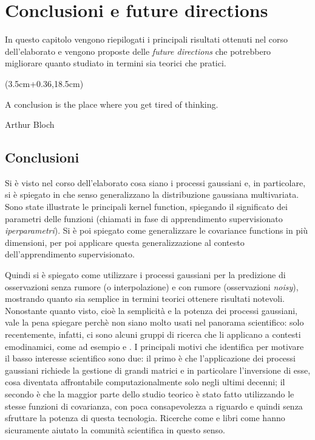 \chapter{Conclusioni e future directions}
In questo capitolo vengono riepilogati i principali risultati ottenuti nel corso dell'elaborato e vengono proposte delle \textit{future directions} che potrebbero migliorare quanto studiato in termini sia teorici che pratici.

\begin{textblock*}{0.64\textwidth}(3.5cm+0.36\textwidth,18.5cm)
\epigraph{A conclusion is the place where you get tired of thinking.}{Arthur Bloch}
\end{textblock*}

\newpage



\section{Conclusioni}
Si è visto nel corso dell'elaborato cosa siano i processi gaussiani e, in particolare, si è spiegato in che senso generalizzano la distribuzione gaussiana multivariata. Sono state illustrate le principali kernel function, spiegando il significato dei parametri delle funzioni (chiamati in fase di apprendimento supervisionato \textit{iperparametri}). Si è poi spiegato come generalizzare le covariance functions in più dimensioni, per poi applicare questa generalizzazione al contesto dell'apprendimento supervisionato.

Quindi si è spiegato come utilizzare i processi gaussiani per la predizione di osservazioni senza rumore (o interpolazione) e con rumore (osservazioni \textit{noisy}), mostrando quanto sia semplice in termini teorici ottenere risultati notevoli.\\

Nonostante quanto visto, cioè la semplicità e la potenza dei processi gaussiani, vale la pena spiegare perchè non siano molto usati nel panorama scientifico: solo recentemente, infatti, ci sono alcuni gruppi di ricerca che li applicano a contesti emodinamici, come ad esempio \cite{doi:10.1098/rsta.2019.0334} e \cite{Yuhn2022.03.10.483573}. I principali motivi che \cite{rasmussen_gaussian_2006} identifica per motivare il basso interesse scientifico sono due: il primo è che l'applicazione dei processi gaussiani richiede la gestione di grandi matrici e in particolare l'inversione di esse, cosa diventata affrontabile computazionalmente solo negli ultimi decenni; il secondo è che la maggior parte dello studio teorico è stato fatto utilizzando le stesse funzioni di covarianza, con poca consapevolezza a riguardo e quindi senza sfruttare la potenza di questa tecnologia. Ricerche come \cite{duvenaud_automatic_2014} e libri come \cite{rasmussen_gaussian_2006} hanno sicuramente aiutato la comunità scientifica in questo senso. \\

